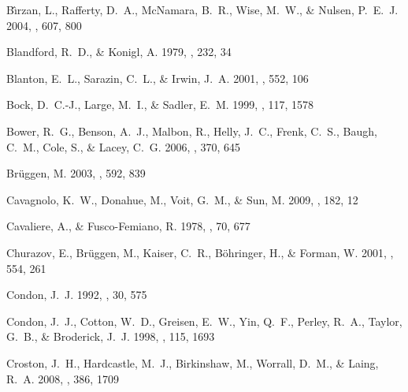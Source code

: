 \documentclass[12pt, preprint]{aastex}
\begin{document}
\begin{thebibliography}{68}
{B{\^\i}rzan}, L., {Rafferty}, D.~A., {McNamara}, B.~R., {Wise}, M.~W., \&
  {Nulsen}, P.~E.~J. 2004, \apj, 607, 800

{Blandford}, R.~D., \& {Konigl}, A. 1979, \apj, 232, 34

{Blanton}, E.~L., {Sarazin}, C.~L., \& {Irwin}, J.~A. 2001, \apj, 552, 106

{Bock}, D.~C.-J., {Large}, M.~I., \& {Sadler}, E.~M. 1999, \aj, 117, 1578

{Bower}, R.~G., {Benson}, A.~J., {Malbon}, R., {Helly}, J.~C., {Frenk}, C.~S.,
  {Baugh}, C.~M., {Cole}, S., \& {Lacey}, C.~G. 2006, \mnras, 370, 645

{Br{\"u}ggen}, M. 2003, \apj, 592, 839

{Cavagnolo}, K.~W., {Donahue}, M., {Voit}, G.~M., \& {Sun}, M. 2009, \apjs,
  182, 12

{Cavaliere}, A., \& {Fusco-Femiano}, R. 1978, \aap, 70, 677

{Churazov}, E., {Br{\"u}ggen}, M., {Kaiser}, C.~R., {B{\"o}hringer}, H., \&
  {Forman}, W. 2001, \apj, 554, 261

{Condon}, J.~J. 1992, \araa, 30, 575

{Condon}, J.~J., {Cotton}, W.~D., {Greisen}, E.~W., {Yin}, Q.~F., {Perley},
  R.~A., {Taylor}, G.~B., \& {Broderick}, J.~J. 1998, \aj, 115, 1693

{Croston}, J.~H., {Hardcastle}, M.~J., {Birkinshaw}, M., {Worrall}, D.~M., \&
  {Laing}, R.~A. 2008, \mnras, 386, 1709


\end{thebibliography}
\end{document}
